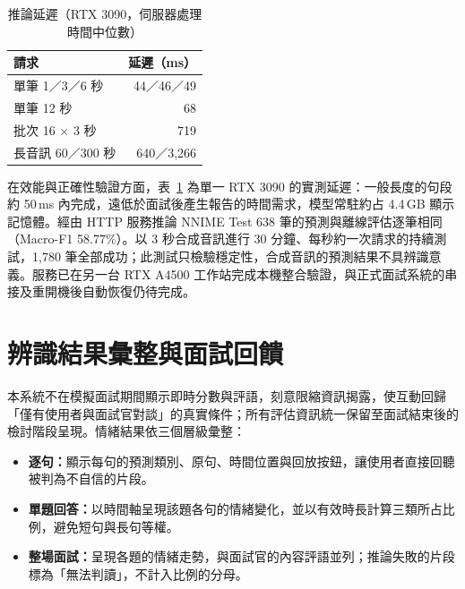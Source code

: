 \begin{table}
\vspace{-1.2em}
\centering
\caption{推論延遲（RTX 3090，伺服器處理時間中位數）}
\label{tab:latency}
\small
\begin{tabular}{@{}lr@{}}
\toprule
請求 & 延遲（ms）\\
\midrule
單筆 1／3／6 秒 & 44／46／49\\
單筆 12 秒 & 68\\
批次 16 × 3 秒 & 719\\
長音訊 60／300 秒 & 640／3,266\\
\bottomrule
\end{tabular}
\vspace{-0.8em}
\end{table}

在效能與正確性驗證方面，表~\ref{tab:latency} 為單一 RTX 3090 的實測延遲：一般長度的句段約 50\,ms 內完成，遠低於面試後產生報告的時間需求，模型常駐約占 4.4\,GB 顯示記憶體。經由 HTTP 服務推論 NNIME Test 638 筆的預測與離線評估逐筆相同（Macro-F1 58.77\%）。以 3 秒合成音訊進行 30 分鐘、每秒約一次請求的持續測試，1,780 筆全部成功；此測試只檢驗穩定性，合成音訊的預測結果不具辨識意義。服務已在另一台 RTX A4500 工作站完成本機整合驗證，與正式面試系統的串接及重開機後自動恢復仍待完成。


\section{辨識結果彙整與面試回饋}
\label{sec:feedback}

本系統不在模擬面試期間顯示即時分數與評語，刻意限縮資訊揭露，使互動回歸「僅有使用者與面試官對談」的真實條件；所有評估資訊統一保留至面試結束後的檢討階段呈現。情緒結果依三個層級彙整：

\begin{itemize}
  \item \textbf{逐句：}顯示每句的預測類別、原句、時間位置與回放按鈕，讓使用者直接回聽被判為不自信的片段。
  \item \textbf{單題回答：}以時間軸呈現該題各句的情緒變化，並以有效時長計算三類所占比例，避免短句與長句等權。
  \item \textbf{整場面試：}呈現各題的情緒走勢，與面試官的內容評語並列；推論失敗的片段標為「無法判讀」，不計入比例的分母。
\end{itemize}

